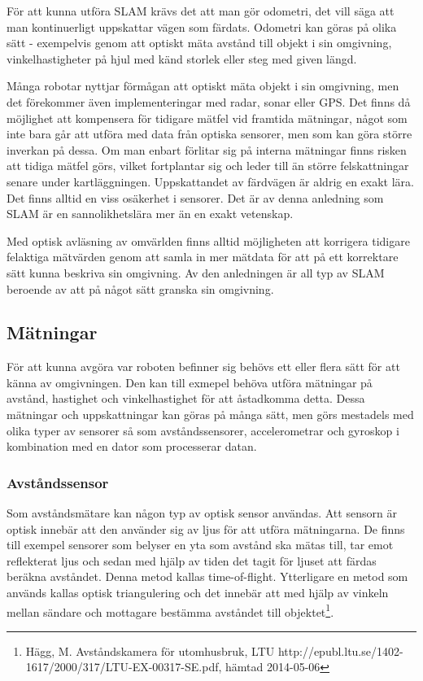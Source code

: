 \documentclass[a4paper,12pt,fleqn]{article}
\begin{document}
För att kunna utföra SLAM krävs det att man gör odometri, det vill säga att man kontinuerligt uppskattar vägen som färdats. Odometri kan göras på olika sätt - exempelvis genom att optiskt mäta avstånd till objekt i sin omgivning, vinkelhastigheter på hjul med känd storlek eller steg med given längd. 

Många robotar nyttjar förmågan att optiskt mäta objekt i sin omgivning, men det förekommer även implementeringar med radar, sonar eller GPS. Det finns då möjlighet att kompensera för tidigare mätfel vid framtida mätningar, något som inte bara går att utföra med data från optiska sensorer, men som kan göra större inverkan på dessa. Om man enbart förlitar sig på interna mätningar finns risken att tidiga mätfel görs, vilket fortplantar sig och leder till än större felskattningar senare under kartläggningen. 
Uppskattandet av färdvägen är aldrig en exakt lära. Det finns alltid en viss osäkerhet i sensorer. Det är av denna anledning som SLAM är en sannolikhetslära mer än en exakt vetenskap. 

Med optisk avläsning av omvärlden finns alltid möjligheten att korrigera tidigare felaktiga mätvärden genom att samla in mer mätdata för att på ett korrektare sätt kunna beskriva sin omgivning. Av den anledningen är all typ av SLAM beroende av att på något sätt granska sin omgivning. 

\subsection{Mätningar}

För att kunna avgöra var roboten befinner sig behövs ett eller flera sätt för att känna av omgivningen. Den kan till exmepel behöva utföra mätningar på avstånd, hastighet och vinkelhastighet för att åstadkomma detta. Dessa mätningar och uppskattningar kan göras på många sätt, men görs mestadels med olika typer av sensorer så som avståndssensorer, accelerometrar och gyroskop i kombination med en dator som processerar datan.

\subsubsection{Avståndssensor}

Som avståndsmätare kan någon typ av optisk sensor användas. Att sensorn är optisk innebär att den använder sig av ljus för att utföra mätningarna. De finns till exempel sensorer som belyser en yta som avstånd ska mätas till, tar emot reflekterat ljus och sedan med hjälp av tiden det tagit för ljuset att färdas beräkna avståndet. Denna metod kallas time-of-flight. Ytterligare en metod som används kallas optisk triangulering och det innebär att med hjälp av vinkeln mellan sändare och mottagare bestämma avståndet till objektet\footnote{Hägg, M. Avståndskamera för utomhusbruk, LTU http://epubl.ltu.se/1402-1617/2000/317/LTU-EX-00317-SE.pdf, hämtad 2014-05-06}.
\end{document}

